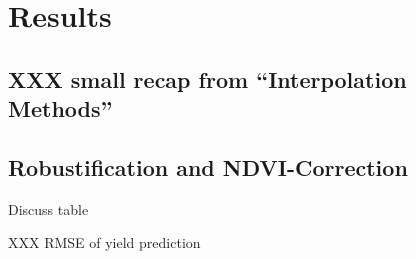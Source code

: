 \chapter{Results}
\section{XXX small recap from ``Interpolation Methods''}

\section{Robustification and NDVI-Correction}
Discuss table
\begin{table}
	\begin{center}
		\caption{XXX RMSE of yield prediction}
		\small
		
		\label{tab:methods_vs_yieldprediction}
		\normalsize
	\end{center}
\end{table}
